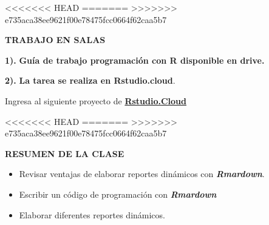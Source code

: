 \documentclass[ignorenonframetext,]{beamer}
\begin{document}
\begin{frame}{}
<<<<<<< HEAD
\protect\hypertarget{section-16}{}
=======
\protect\hypertarget{section-14}{}
>>>>>>> e735aca38ee9621f00e78475fcc0664f62caa5b7

\textbf{TRABAJO EN SALAS}

\textbf{1).} \textbf{Guía de trabajo programación con R disponible en
drive.}

\textbf{2).} \textbf{La tarea se realiza en Rstudio.cloud}.

Ingresa al siguiente proyecto de
\textbf{\href{https://rstudio.cloud/spaces/135178/project/2447826/}{Rstudio.Cloud}}

\end{frame}

\begin{frame}{}
<<<<<<< HEAD
\protect\hypertarget{section-17}{}
=======
\protect\hypertarget{section-15}{}
>>>>>>> e735aca38ee9621f00e78475fcc0664f62caa5b7

\textbf{RESUMEN DE LA CLASE}

\begin{itemize}
\item
  Revisar ventajas de elaborar reportes dinámicos con
  \textbf{\emph{Rmardown}}.
\item
  Escribir un código de programación con \textbf{\emph{Rmardown}}
\item
  Elaborar diferentes reportes dinámicos.
\end{itemize}

\end{frame}
\end{document}
